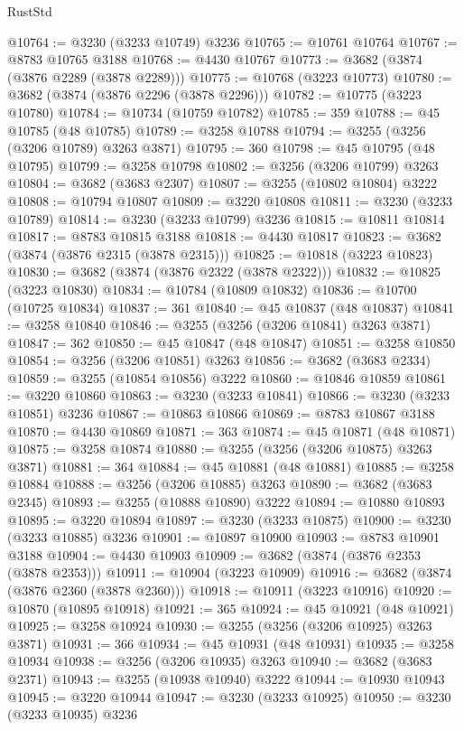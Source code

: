 \begin{lexlean}{RustStd}
\begin{coremodule}
@10764 := @3230 (@3233 @10749) @3236
@10765 := @10761 @10764
@10767 := @8783 @10765 @3188
@10768 := @4430 @10767
@10773 := @3682 (@3874 (@3876 @2289 (@3878 @2289)))
@10775 := @10768 (@3223 @10773)
@10780 := @3682 (@3874 (@3876 @2296 (@3878 @2296)))
@10782 := @10775 (@3223 @10780)
@10784 := @10734 (@10759 @10782)
@10785 := 359
@10788 := @45 @10785 (@48 @10785)
@10789 := @3258 @10788
@10794 := @3255 (@3256 (@3206 @10789) @3263 @3871)
@10795 := 360
@10798 := @45 @10795 (@48 @10795)
@10799 := @3258 @10798
@10802 := @3256 (@3206 @10799) @3263
@10804 := @3682 (@3683 @2307)
@10807 := @3255 (@10802 @10804) @3222
@10808 := @10794 @10807
@10809 := @3220 @10808
@10811 := @3230 (@3233 @10789)
@10814 := @3230 (@3233 @10799) @3236
@10815 := @10811 @10814
@10817 := @8783 @10815 @3188
@10818 := @4430 @10817
@10823 := @3682 (@3874 (@3876 @2315 (@3878 @2315)))
@10825 := @10818 (@3223 @10823)
@10830 := @3682 (@3874 (@3876 @2322 (@3878 @2322)))
@10832 := @10825 (@3223 @10830)
@10834 := @10784 (@10809 @10832)
@10836 := @10700 (@10725 @10834)
@10837 := 361
@10840 := @45 @10837 (@48 @10837)
@10841 := @3258 @10840
@10846 := @3255 (@3256 (@3206 @10841) @3263 @3871)
@10847 := 362
@10850 := @45 @10847 (@48 @10847)
@10851 := @3258 @10850
@10854 := @3256 (@3206 @10851) @3263
@10856 := @3682 (@3683 @2334)
@10859 := @3255 (@10854 @10856) @3222
@10860 := @10846 @10859
@10861 := @3220 @10860
@10863 := @3230 (@3233 @10841)
@10866 := @3230 (@3233 @10851) @3236
@10867 := @10863 @10866
@10869 := @8783 @10867 @3188
@10870 := @4430 @10869
@10871 := 363
@10874 := @45 @10871 (@48 @10871)
@10875 := @3258 @10874
@10880 := @3255 (@3256 (@3206 @10875) @3263 @3871)
@10881 := 364
@10884 := @45 @10881 (@48 @10881)
@10885 := @3258 @10884
@10888 := @3256 (@3206 @10885) @3263
@10890 := @3682 (@3683 @2345)
@10893 := @3255 (@10888 @10890) @3222
@10894 := @10880 @10893
@10895 := @3220 @10894
@10897 := @3230 (@3233 @10875)
@10900 := @3230 (@3233 @10885) @3236
@10901 := @10897 @10900
@10903 := @8783 @10901 @3188
@10904 := @4430 @10903
@10909 := @3682 (@3874 (@3876 @2353 (@3878 @2353)))
@10911 := @10904 (@3223 @10909)
@10916 := @3682 (@3874 (@3876 @2360 (@3878 @2360)))
@10918 := @10911 (@3223 @10916)
@10920 := @10870 (@10895 @10918)
@10921 := 365
@10924 := @45 @10921 (@48 @10921)
@10925 := @3258 @10924
@10930 := @3255 (@3256 (@3206 @10925) @3263 @3871)
@10931 := 366
@10934 := @45 @10931 (@48 @10931)
@10935 := @3258 @10934
@10938 := @3256 (@3206 @10935) @3263
@10940 := @3682 (@3683 @2371)
@10943 := @3255 (@10938 @10940) @3222
@10944 := @10930 @10943
@10945 := @3220 @10944
@10947 := @3230 (@3233 @10925)
@10950 := @3230 (@3233 @10935) @3236

\end{coremodule}
\end{lexlean}
